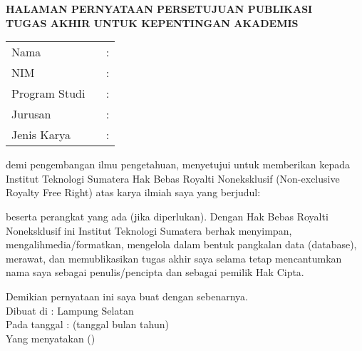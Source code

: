 \clearpage
{}%

\begin{center}
	\smallskip
	
	\normalsize \bfseries \MakeUppercase{
		HALAMAN PERNYATAAN PERSETUJUAN PUBLIKASI \\
		TUGAS AKHIR UNTUK KEPENTINGAN AKADEMIS
	}\linebreak
	
	\normalsize \normalfont \onehalfspacing {}
	
	\flushleft
	\setlength{\tabcolsep}{0pt}
	\begin{tabular}{l l}
		Nama 			&  : \\
		NIM 			&  : \\
		Program Studi \	&  : \\
		Jurusan 		&  : \\
		Jenis Karya 	&  : \\
	\end{tabular}

	\justifying
	demi pengembangan ilmu pengetahuan, menyetujui untuk memberikan kepada Institut Teknologi Sumatera Hak Bebas Royalti Noneksklusif (Non-exclusive Royalty Free Right) atas karya ilmiah saya yang berjudul: 
	
	\centering
	\thetitle
	
	\justifying
	beserta perangkat yang ada (jika diperlukan). Dengan Hak Bebas Royalti Noneksklusif ini Institut Teknologi Sumatera berhak menyimpan, mengalihmedia/formatkan, mengelola dalam bentuk pangkalan data (database), merawat, dan memublikasikan tugas akhir saya selama tetap mencantumkan nama saya sebagai penulis/pencipta dan sebagai pemilik Hak Cipta.
	
	Demikian pernyataan ini saya buat dengan sebenarnya. \\
	
	\centering
	Dibuat di : Lampung Selatan\\
	Pada tanggal : (tanggal bulan tahun)\\
	\vspace{3cm}
	Yang menyatakan (\theauthor)
	
	
\end{center}
\clearpage
